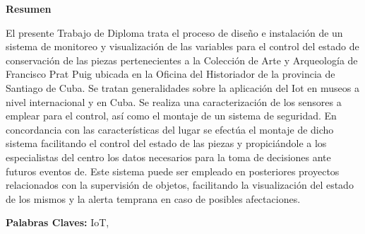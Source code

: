 \setcounter{page}{4}
\thispagestyle{plain}

    \textbf{\Large Resumen}
\newline

El presente Trabajo de Diploma trata el proceso de diseño e instalación de un sistema de monitoreo y visualización de las variables para el control del estado de conservación de las piezas pertenecientes a la Colección de Arte y Arqueología de Francisco Prat Puig ubicada en la Oficina del Historiador de la provincia de Santiago de Cuba. Se tratan generalidades sobre la aplicación del Iot en museos a nivel internacional y en Cuba. Se realiza una caracterización de los sensores a emplear para el control, así como el montaje de un sistema de seguridad.
En concordancia con las características del lugar se efectúa el montaje de dicho sistema facilitando el control del estado de las piezas y propiciándole a los especialistas del centro los datos necesarios para la toma de decisiones ante futuros eventos de. Este sistema puede ser empleado en posteriores proyectos relacionados con la supervisión de objetos, facilitando la visualización del estado de los mismos y la alerta temprana en caso de posibles afectaciones.

\textbf{Palabras Claves: }IoT,